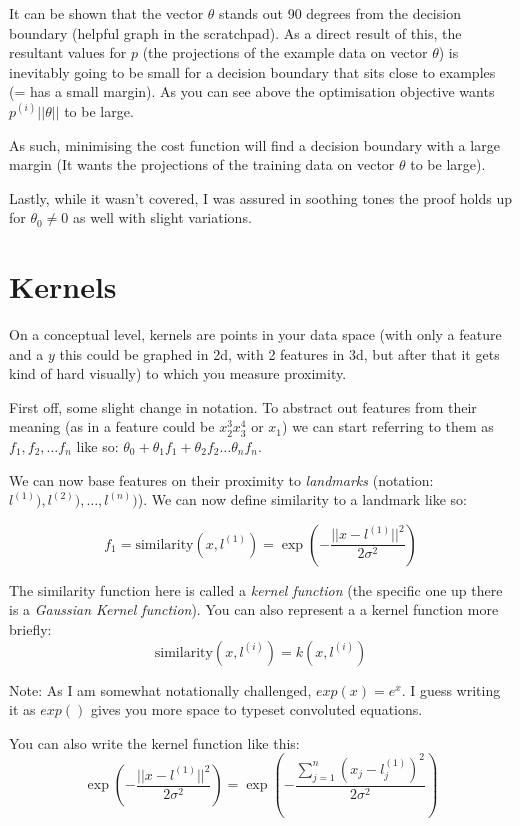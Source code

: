 It can be shown that the vector $\theta$ stands out 90 degrees from the decision boundary (helpful graph in the scratchpad). As a direct result of this, the resultant values for $p$ (the projections of the example data on vector $\theta$) is inevitably going to be small for a decision boundary that sits close to examples (= has a small margin). As you can see above the optimisation objective wants $p^{(i)}||\theta||$ to be large. 

As such, minimising the cost function will find a decision boundary with a large margin (It wants the projections of the training data on vector $\theta$ to be large).

Lastly, while it wasn't covered, I was assured in soothing tones the proof holds up for $\theta_0 \neq 0$ as well with slight variations.

\section{Kernels}

On a conceptual level, kernels are points in your data space (with only a feature and a $y$ this could be graphed in 2d, with 2 features in 3d, but after that it gets kind of hard visually) to which you measure proximity.

First off, some slight change in notation. To abstract out features from their meaning (as in a feature could be $x_2^3x_3^4$ or $x_1$) we can start referring to them as $f_1, f_2, \dots f_n$ like so: $\theta_0 +\theta_1f_1 + \theta_2f_2 \dots \theta_nf_n$.

We can now base features on their proximity to \emph{landmarks} (notation: $l^{(1)}), l^{(2)}), \dots, l^{(n)})$). We can now define similarity to a landmark like so:

\[
f_1 = \textrm{similarity}(x, l^{(1)}) = \exp{(-\frac{||x - l^{(1)}||^2}{2\sigma^2})}
\]

The similarity function here is called a \emph{kernel function} (the specific one up there is a \emph{Gaussian Kernel function}). You can also represent a a kernel function more briefly:
\[
\mathrm{similarity}(x, l^{(i)}) = k(x, l^{(i)})
\]

Note: As I am somewhat notationally challenged, $exp(x) = e^x$. I guess writing it as $exp()$ gives you more space to typeset convoluted equations.

You can also write the kernel function like this:
\[
\exp{(-\frac{||x - l^{(1)}||^2}{2\sigma^2})} =
\exp{(-\frac{\sum^n_{j = 1}(x_j - l_j^{(1)})^2}{2\sigma^2})}
\]

